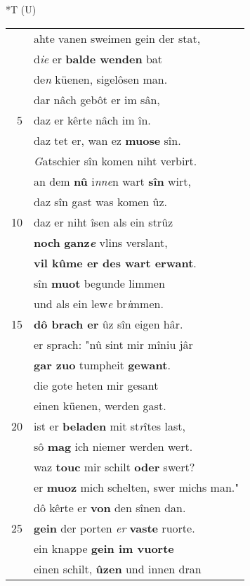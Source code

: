 \documentclass[8pt,a4paper,notitlepage]{article}
\begin{document}
\begin{table}[ht]
\begin{minipage}[t]{0.5\linewidth}
\end{minipage}
\hspace{0.5cm}
\begin{minipage}[t]{0.5\linewidth}
\small
\begin{center}*T (U)
\end{center}
\begin{tabular}{rl}
 & ahte vanen sweimen gein der stat,\\ 
 & d\textit{ie} er \textbf{balde wenden} bat\\ 
 & de\textit{n} küenen, sigelôsen man.\\ 
 & dar nâch gebôt er im sân,\\ 
5 & daz er kêrte nâch im în.\\ 
 & daz tet er, wan ez \textbf{muose} sîn.\\ 
 & \textit{G}atschier sîn komen niht verbirt.\\ 
 & an dem \textbf{nû} i\textit{nne}n wart \textbf{sîn} wirt,\\ 
 & daz sîn gast was komen ûz.\\ 
10 & daz er niht îsen als ein strûz\\ 
 & \textbf{noch} \textbf{ganz\textit{e}} vlins verslant,\\ 
 & \textbf{vil kûme er des wart erwant}.\\ 
 & sîn \textbf{muot} begunde limmen\\ 
 & und als ein lew\textit{e} br\textit{i}mmen.\\ 
15 & \textbf{dô brach er} ûz sîn eigen hâr.\\ 
 & er sprach: "nû sint mir mîniu jâr\\ 
 & \textbf{gar zuo} tumpheit \textbf{gewant}.\\ 
 & die gote heten mir gesant\\ 
 & einen küenen, werden gast.\\ 
20 & ist er \textbf{beladen} mit st\textit{r}îtes last,\\ 
 & sô \textbf{mag} ich niemer werden wert.\\ 
 & waz \textbf{touc} mir schilt \textbf{oder} swert?\\ 
 & er \textbf{muoz} mich schelten, swer michs man."\\ 
 & dô kêrte er \textbf{von} den sînen dan.\\ 
25 & \textbf{gein} der porten \textit{er} \textbf{vaste} ruorte.\\ 
 & ein knappe \textbf{gein im vuorte}\\ 
 & einen schilt, \textbf{ûzen} und innen dran\\ 

\end{tabular}
\end{minipage}
\end{table}
\end{document}
